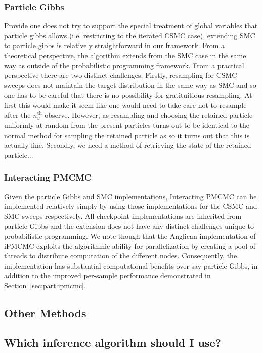 \subsubsection{Particle Gibbs}
\label{sec:proginf:str:part:pgibbs}

Provide one does not try to support the special treatment of global variables that particle
gibbs allows (i.e. restricting to the iterated CSMC case), extending SMC to particle gibbs
is relatively straightforward in our framework.  From a theoretical perspective, the algorithm
extends from the SMC case in the same way as outside of the probabilistic programming framework.
From a practical perspective there are two distinct challenges.  Firstly, resampling for CSMC
sweeps does not maintain the target distribution in the same way as SMC and so one has
to be careful that there is no possibility for gratituitious resampling.  At first this would make it
seem like one would need to take care not to resample after the $n_y^{\mathrm{th}}$ observe.
However, as resampling and choosing the retained particle uniformly at random from the
present particles turns out to be identical to the normal method for sampling the retained particle
as so it turns out that this is actually fine.  Secondly, we need a method of retrieving the state
of the retained particle...


\subsubsection{Interacting PMCMC}
\label{sec:proginf:str:part:ipmcmc}

Given the particle Gibbs and SMC implementations, Interacting PMCMC can be implemented
relatively simply by using those implementations for the CSMC and SMC sweeps respectively.
All checkpoint implementations are inherited from particle Gibbs and the extension does
not have any distinct challenges unique to probabilistic programming.  We note though that
the Anglican implementation of iPMCMC exploits the algorithmic ability for parallelization 
by creating a pool of threads to distribute computation of the different nodes.   Consequently,
the implementation has substantial computational benefits over say particle Gibbs, in addition
to the improved per-sample performance demonstrated in Section~\ref{sec:part:ipmcmc}.

\subsection{Other Methods}
\label{sec:proginf:str:part:other}

\subsection{Which inference algorithm should I use?}
\label{sec:proginf:str:which}

